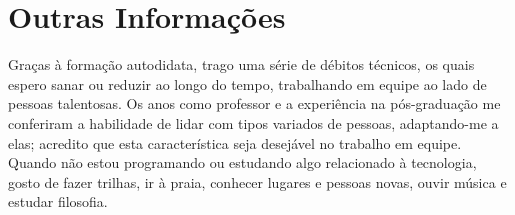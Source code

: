 \documentclass[letterpaper]{twentysecondcv} %
\begin{document}

\section{Outras Informações}

Graças à formação autodidata, trago uma série de débitos técnicos, os
quais espero sanar ou reduzir ao longo do tempo, trabalhando em equipe
ao lado de pessoas talentosas. Os anos como professor e a experiência na
pós-graduação me conferiram a habilidade de lidar com tipos variados de
pessoas, adaptando-me a elas; acredito que esta característica seja
desejável no trabalho em equipe. Quando não estou programando ou
estudando algo relacionado à tecnologia, gosto de fazer trilhas, ir à
praia, conhecer lugares e pessoas novas, ouvir música e estudar
filosofia.






\end{document}
